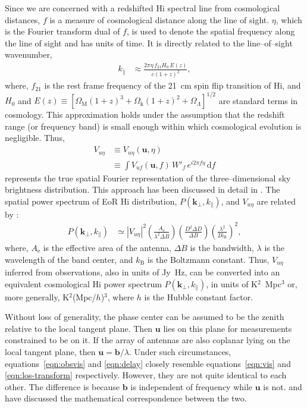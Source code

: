 \documentclass[preprint2,iop,numberedappendix]{emulateapj}
\newcommand{\dif}{\mathrm{d}}
\begin{document}
Since we are concerned with a redshifted H{\sc i} spectral line from cosmological distances, $f$ is a measure of cosmological distance along the line of sight. $\eta$, which is the Fourier transform dual of $f$, is used to denote the spatial frequency along the line of sight and has units of time. It is directly related to the line--of--sight wavenumber, 
\begin{align}\label{eqn:k-prll}
  k_\parallel &\approx \frac{2\pi\eta\,f_{21}H_0\,E(z)}{c(1+z)^2}, 
\end{align}
where, $f_{21}$ is the rest frame frequency of the 21~cm spin flip transition of H{\sc i}, and $H_0$ and $E(z)\equiv [\Omega_\textrm{M}(1+z)^3+\Omega_\textrm{k}(1+z)^2+\Omega_\Lambda]^{1/2}$ are standard terms in cosmology. This approximation holds under the assumption that the redshift range (or frequency band) is small enough within which cosmological evolution is negligible. Thus,
\begin{align}\label{eqn:los-transform}
  V_{u\eta} &\equiv V_{u\eta}(\boldsymbol{u},\eta) \nonumber\\
  &\equiv \int V_{uf}(\boldsymbol{u},f)\,W'_f\,e^{i2\pi f\eta}\,\dif f
\end{align}
represents the true spatial Fourier representation of the three--dimensional sky brightness distribution. This approach has been discussed in detail in \citet{mor04}. The spatial power spectrum of EoR H{\sc i} distribution, $P(\boldsymbol{k}_\perp,k_\parallel)$, and $V_{u\eta}$ are related by \citep{mor04,mcq06,par12a}: 
\begin{align}\label{eqn:true-power_spectrum}
  P(\boldsymbol{k}_\perp,k_\parallel) &\simeq |V_{u\eta}|^2\left(\frac{A_\textrm{e}}{\lambda^2\Delta B}\right)\left(\frac{D^2\Delta D}{\Delta B}\right)\left(\frac{\lambda^2}{2k_\textrm{B}}\right)^2,
\end{align}
where, $A_\textrm{e}$ is the effective area of the antenna, $\Delta B$ is the bandwidth, $\lambda$ is the wavelength of the band center, and $k_\textrm{B}$ is the Boltzmann constant. Thus, $V_{u\eta}$ inferred from observations, also in units of Jy~Hz, can be converted into an equivalent cosmological H{\sc i} power spectrum $P(\boldsymbol{k}_\perp,k_\parallel)$, in units of K$^2$~Mpc$^3$ or, more generally, K$^2$(Mpc/$h$)$^3$, where $h$ is the Hubble constant factor.

Without loss of generality, the phase center can be assumed to be the zenith relative to the local tangent plane. Then $\boldsymbol{u}$ lies on this plane for measurements constrained to be on it. If the array of antennas are also coplanar lying on the local tangent plane, then $\boldsymbol{u}=\boldsymbol{b}/\lambda$. Under such circumstances, equations~\ref{eqn:obsvis} and \ref{eqn:delay} closely resemble equations~\ref{eqn:vis} and \ref{eqn:los-transform} respectively. However, they are not quite identical to each other. The difference is because $\boldsymbol{b}$ is independent of frequency while $\boldsymbol{u}$ is not. \citet{par12b} and \citet{liu14a} have discussed the mathematical correspondence between the two. 
\end{document}
